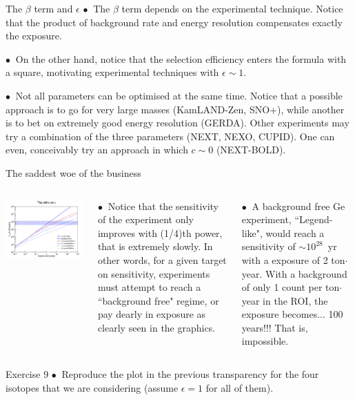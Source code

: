 \documentclass [aspectratio=169]{beamer}
\begin{document}
 
 \begin{frame}{The $\beta$ term and $\epsilon$}
$\bullet~$ The $\beta$ term depends on the experimental technique. Notice that the product of background rate and energy resolution compensates exactly the exposure. 

 $\bullet~$ On the other hand, notice that the selection efficiency enters the formula with a square, motivating experimental techniques with $\epsilon \sim 1$. 
 
 $\bullet~$ Not all parameters can be optimised at the same time. Notice that a possible approach is to go for very large masses (KamLAND-Zen, SNO+), while another is to bet on extremely good energy resolution (GERDA). Other experiments may try a combination of the three parameters (NEXT, NEXO, CUPID). One can even, conceivably try an approach in which $c \sim 0$ (NEXT-BOLD). 
 
 \end{frame}
 
 
 \begin{frame}{The saddest woe of the business}
 
 \begin{columns}
\includegraphics[scale=0.28]{ gesensi.png}

$\bullet~$ Notice that the sensitivity of the experiment only improves with (1/4)th power, that is extremely slowly. In other words, for a given target on sensitivity, experiments must attempt to reach a ``background free" regime, or pay dearly in exposure as clearly seen in the graphics.

$\bullet~$ A background free Ge experiment, ``Legend-like", would reach a sensitivity of $\sim 10^{28}$~yr with a exposure of 2 ton$\cdot$year. With a background of only 1 count per ton$\cdot$ year in the ROI, the exposure becomes... 100 years!!! That is, impossible. 
\end{columns}
\end{frame}

\begin{frame}{Exercise 9}
$\bullet~$ Reproduce the plot in the previous transparency for the four isotopes that we are considering (assume $\epsilon =1$ for all of them). 
\end{frame}
 
\end{document}
